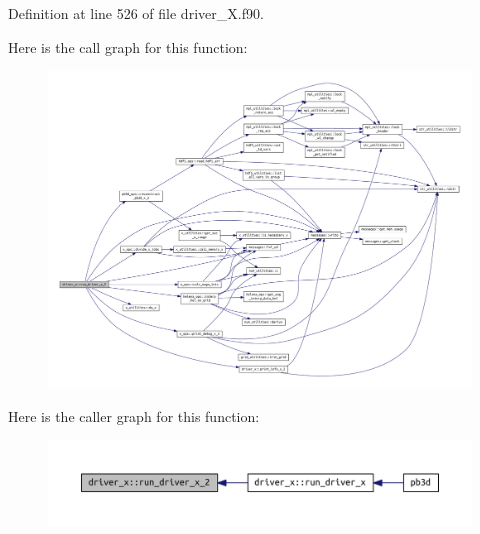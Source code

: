 Definition at line 526 of file driver\+\_\+\+X.\+f90.

Here is the call graph for this function\+:\nopagebreak
\begin{figure}[H]
\begin{center}
\leavevmode
\includegraphics[width=350pt]{namespacedriver__x_ad3924b3d66f336f0a9a9559eafffec8e_cgraph}
\end{center}
\end{figure}
Here is the caller graph for this function\+:\nopagebreak
\begin{figure}[H]
\begin{center}
\leavevmode
\includegraphics[width=350pt]{namespacedriver__x_ad3924b3d66f336f0a9a9559eafffec8e_icgraph}
\end{center}
\end{figure}
